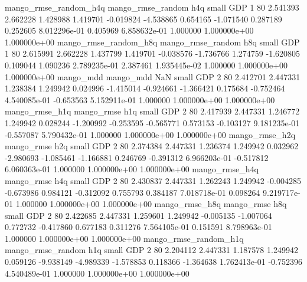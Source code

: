 mango_rmse_random_h4q mango_rmse_random                  h4q      small      GDP                 1 80 2.541393       2.662228 1.428988       1.419701   -0.019824     -4.538865      0.654165    -1.071540       0.287189  0.252605 8.012296e-01     0.405969   6.858632e-01            1.000000    1.000000e+00        1.000000e+00
mango_rmse_random_h8q mango_rmse_random                  h8q      small      GDP                 1 80 2.615991       2.662228 1.437799       1.419701   -0.038576     -1.736766      1.274759    -1.620805       0.109044  1.090236 2.789235e-01     2.387461   1.935445e-02            1.000000    1.000000e+00        1.000000e+00
            mango_mdd         mango_mdd                  NaN      small      GDP                 2 80 2.412701       2.447331 1.238384       1.249942    0.024996     -1.415014     -0.924661    -1.366421       0.175684 -0.752464 4.540085e-01    -0.653563   5.152911e-01            1.000000    1.000000e+00        1.000000e+00
       mango_rmse_h1q        mango_rmse                  h1q      small      GDP                 2 80 2.417939       2.447331 1.246772       1.249942    0.028244     -1.200992     -0.253595    -0.565771       0.573153 -0.103127 9.181235e-01    -0.557087   5.790432e-01            1.000000    1.000000e+00        1.000000e+00
       mango_rmse_h2q        mango_rmse                  h2q      small      GDP                 2 80 2.374384       2.447331 1.236374       1.249942    0.032962     -2.980693     -1.085461    -1.166881       0.246769 -0.391312 6.966203e-01    -0.517812   6.060363e-01            1.000000    1.000000e+00        1.000000e+00
       mango_rmse_h4q        mango_rmse                  h4q      small      GDP                 2 80 2.430837       2.447331 1.262243       1.249942   -0.004285     -0.673986      0.984121    -0.312092       0.755793  0.384187 7.018718e-01     0.098264   9.219717e-01            1.000000    1.000000e+00        1.000000e+00
       mango_rmse_h8q        mango_rmse                  h8q      small      GDP                 2 80 2.422685       2.447331 1.259601       1.249942   -0.005135     -1.007064      0.772732    -0.417860       0.677183  0.311276 7.564105e-01     0.151591   8.798963e-01            1.000000    1.000000e+00        1.000000e+00
mango_rmse_random_h1q mango_rmse_random                  h1q      small      GDP                 2 80 2.204112       2.447331 1.187578       1.249942    0.059126     -9.938149     -4.989339    -1.578853       0.118366 -1.364638 1.762413e-01    -0.752396   4.540489e-01            1.000000    1.000000e+00        1.000000e+00
